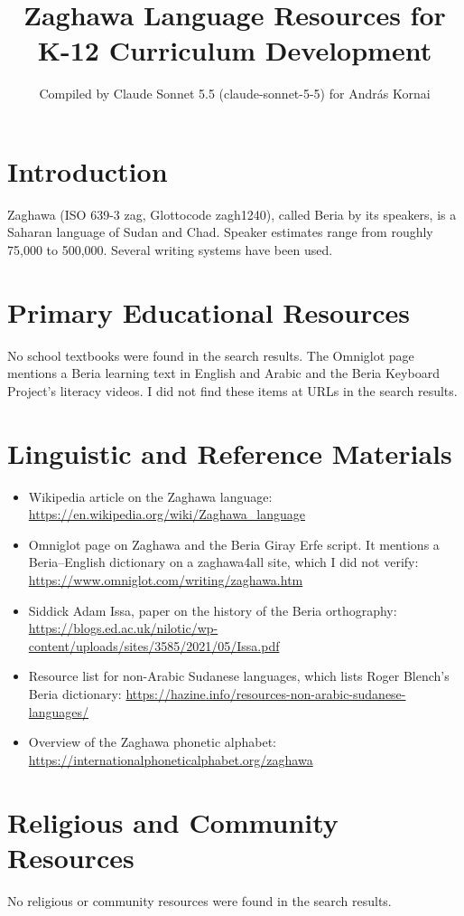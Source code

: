 \documentclass[12pt]{article}
\title{Zaghawa Language Resources for K-12 Curriculum Development}
\author{Compiled by Claude Sonnet 5.5 (claude-sonnet-5-5) for Andr\'as Kornai}
\date{}
\begin{document}
\maketitle

\section{Introduction}
Zaghawa (ISO 639-3 zag, Glottocode zagh1240), called Beria by its speakers, is a Saharan language of Sudan and Chad. Speaker estimates range from roughly 75,000 to 500,000. Several writing systems have been used.

\section{Primary Educational Resources}
No school textbooks were found in the search results. The Omniglot page mentions a Beria learning text in English and Arabic and the Beria Keyboard Project's literacy videos. I did not find these items at URLs in the search results.

\section{Linguistic and Reference Materials}
\begin{itemize}
\item Wikipedia article on the Zaghawa language: \url{https://en.wikipedia.org/wiki/Zaghawa_language}
\item Omniglot page on Zaghawa and the Beria Giray Erfe script. It mentions a Beria--English dictionary on a zaghawa4all site, which I did not verify: \url{https://www.omniglot.com/writing/zaghawa.htm}
\item Siddick Adam Issa, paper on the history of the Beria orthography: \url{https://blogs.ed.ac.uk/nilotic/wp-content/uploads/sites/3585/2021/05/Issa.pdf}
\item Resource list for non-Arabic Sudanese languages, which lists Roger Blench's Beria dictionary: \url{https://hazine.info/resources-non-arabic-sudanese-languages/}
\item Overview of the Zaghawa phonetic alphabet: \url{https://internationalphoneticalphabet.org/zaghawa}
\end{itemize}

\section{Religious and Community Resources}
No religious or community resources were found in the search results.
\end{document}
